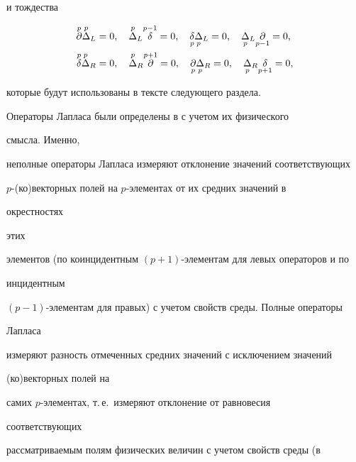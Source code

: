 и тождества 


\begin{equation} 


\begin{split} 


\up{p}{\partial}\up{p}{\Delta}_L&=0,\quad 


\up{p}{\Delta}_L\up{p-1}{\delta}=0,\quad 


\down{p}{\delta}\down{p}{\Delta}_L=0,\quad 


\down{p}{\Delta}_L\down{p-1}{\partial}=0, \\ 


% 


\up{p}{\delta}\up{p}{\Delta}_R&=0,\quad 


\up{p}{\Delta}_R\up{p+1}{\partial}=0,\quad 


\down{p}{\partial}\down{p}{\Delta}_R=0,\quad 


\down{p}{\Delta}_R\down{p+1}{\delta}=0, 


\end{split} 


\end{equation} 


которые будут использованы в тексте следующего раздела. 


 


Операторы Лапласа были определены в \cite{2} с учетом их физического 


смысла. Именно, 


неполные операторы Лапласа измеряют отклонение значений соответствующих 


$p$-(ко)векторных полей на $p$-элементах от их средних значений в 


окрестностях 


этих  


элементов (по коинцидентным $(p+1)$-элементам для левых операторов и по 


инцидентным  


$(p-1)$-элементам для правых) с учетом свойств среды. Полные операторы 


Лапласа 


измеряют разность отмеченных средних значений с исключением значений 


(ко)векторных полей на  


самих $p$-элементах, т.\,е.~измеряют отклонение от равновесия 


соответствующих  


рассматриваемым полям физических величин с учетом свойств среды (в 


